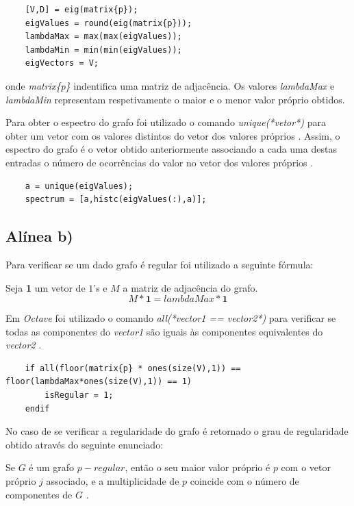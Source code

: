 \documentclass[a4paper,12pt]{report}
\begin{document}
\begin{lstlisting}
    [V,D] = eig(matrix{p});
    eigValues = round(eig(matrix{p}));
    lambdaMax = max(max(eigValues));
    lambdaMin = min(min(eigValues));
    eigVectors = V;
\end{lstlisting} onde \textit{matrix\{p\}} indentifica uma matriz de adjacência. Os valores \textit{lambdaMax} e \textit{lambdaMin} representam respetivamente o maior e o menor valor próprio obtidos.

Para obter o espectro do grafo foi utilizado o comando \textit{unique(*vetor*)} para obter um vetor com os valores distintos do vetor dos valores próprios \cite{WEBSITE2}.
Assim, o espectro do grafo é o vetor obtido anteriormente associando a cada uma destas entradas o número de ocorrências do valor no vetor dos valores próprios \cite{WEBSITE3}.

\begin{lstlisting}
    a = unique(eigValues);
    spectrum = [a,histc(eigValues(:),a)];
\end{lstlisting}

\subsection*{Alínea b)}

Para verificar se um dado grafo é regular foi utilizado a seguinte fórmula:

Seja \textbf{1} um vetor de $1$'s e $M$ a matriz de adjacência do grafo.
\begin{equation}
    M*\textbf{1} = \textit{lambdaMax}*\textbf{1}
\end{equation}

Em \textit{Octave} foi utilizado o comando \textit{all(*vector1 == vector2*)} para verificar se todas as componentes do \textit{vector1} são iguais às componentes equivalentes do \textit{vector2} \cite{WEBSITE4}.

\begin{lstlisting}
    if all(floor(matrix{p} * ones(size(V),1)) == floor(lambdaMax*ones(size(V),1)) == 1)
        isRegular = 1;
    endif
\end{lstlisting}

No caso de se verificar a regularidade do grafo é retornado o grau de regularidade obtido através do seguinte enunciado:

\begin{center}
    Se $G$ é um grafo $p-regular$, então o seu maior valor próprio é $p$ com o vetor próprio $j$ associado, e a multiplicidade de $p$ coincide com o número de componentes de $G$ \cite{WEBSITE5}.
\end{center}
\end{document}
